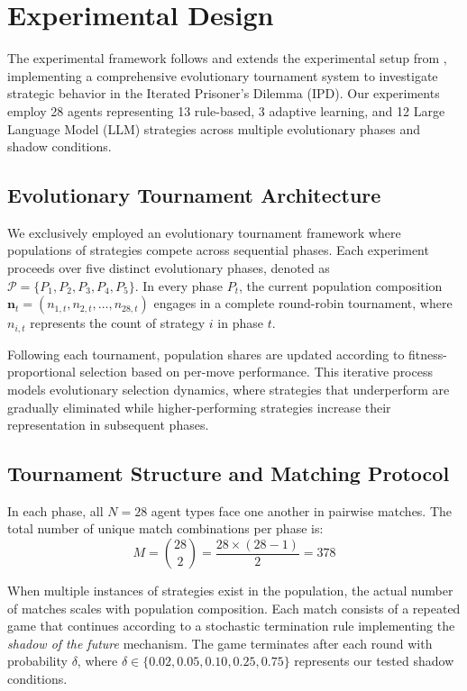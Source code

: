 \section{Experimental Design}

The experimental framework follows and extends the experimental setup from \cite{payne2025strategic}, implementing a comprehensive evolutionary tournament system to investigate strategic behavior in the Iterated Prisoner's Dilemma (IPD). Our experiments employ 28 agents representing 13 rule-based, 3 adaptive learning, and 12 Large Language Model (LLM) strategies across multiple evolutionary phases and shadow conditions.

\subsection{Evolutionary Tournament Architecture}

We exclusively employed an evolutionary tournament framework where populations of strategies compete across sequential phases. Each experiment proceeds over five distinct evolutionary phases, denoted as $\mathcal{P} = \{P_1, P_2, P_3, P_4, P_5\}$. In every phase $P_t$, the current population composition $\mathbf{n}_t = (n_{1,t}, n_{2,t}, \ldots, n_{28,t})$ engages in a complete round-robin tournament, where $n_{i,t}$ represents the count of strategy $i$ in phase $t$.

Following each tournament, population shares are updated according to fitness-proportional selection based on per-move performance. This iterative process models evolutionary selection dynamics, where strategies that underperform are gradually eliminated while higher-performing strategies increase their representation in subsequent phases.

\subsection{Tournament Structure and Matching Protocol}

In each phase, all $N = 28$ agent types face one another in pairwise matches. The total number of unique match combinations per phase is:
\[
M = \binom{28}{2} = \frac{28 \times (28 - 1)}{2} = 378
\]

When multiple instances of strategies exist in the population, the actual number of matches scales with population composition. Each match consists of a repeated game that continues according to a stochastic termination rule implementing the \emph{shadow of the future} mechanism. The game terminates after each round with probability $\delta$, where $\delta \in \{0.02, 0.05, 0.10, 0.25, 0.75\}$ represents our tested shadow conditions.

